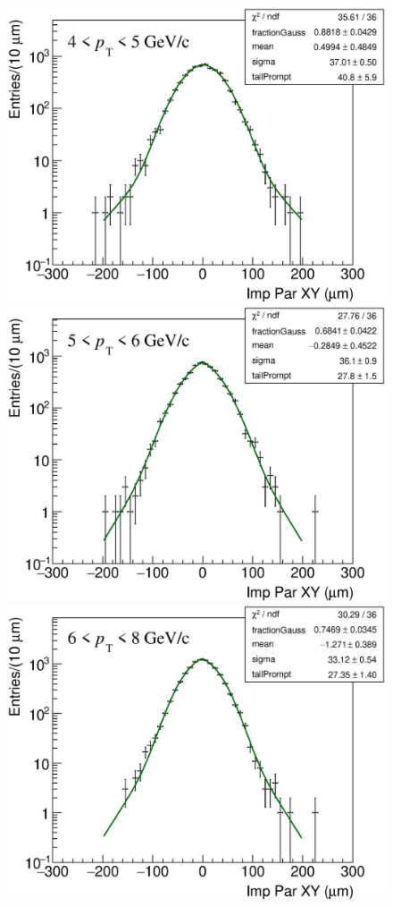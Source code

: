 \documentclass[b5paper,10pt,twoside,oldstyle,classica]{toptesi}
\begin{document}
\begin{figure}[h]
\begin{center}
{\includegraphics[scale = 0.24]{ImpParPrompt_4-5.eps}}
\hspace{0cm}
{\includegraphics[scale = 0.24]{ImpParPrompt_5-6.eps}}
\vspace{0cm}
{\includegraphics[scale = 0.24]{ImpParPrompt_6-8.eps}}

\end{center}
\end{figure}
\end{document}
